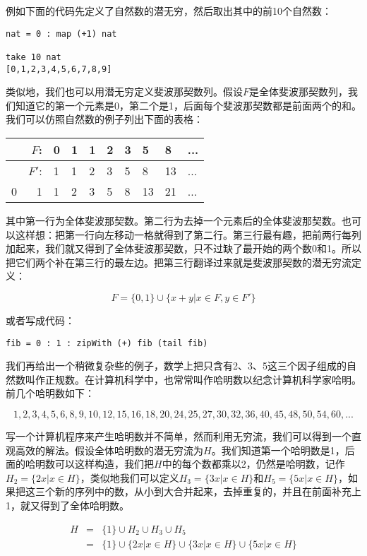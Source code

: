 \documentclass{article}
\begin{document}
例如下面的代码先定义了自然数的潜无穷，然后取出其中的前10个自然数：

\lstset{frame=single}
\begin{lstlisting}
nat = 0 : map (+1) nat

take 10 nat
[0,1,2,3,4,5,6,7,8,9]
\end{lstlisting}

类似地，我们也可以用潜无穷定义斐波那契数列。假设$F$是全体斐波那契数列，我们知道它的第一个元素是0，第二个是1，后面每个斐波那契数都是前面两个的和。我们可以仿照自然数的例子列出下面的表格：

\begin{tabular}{|r|r|l|l|l|l|l|l|l|l|}
\hline
  & $F$:  & 0 & 1 & 1 & 2 & 3 & 5 & 8 & ... \\
\hline
  & $F'$: & 1 & 1 & 2 & 3 & 5 & 8 & 13 & ... \\
\hline
0 & 1     & 1 & 2 & 3 & 5 & 8 & 13 & 21 & ... \\
\hline
\end{tabular}

其中第一行为全体斐波那契数。第二行为去掉一个元素后的全体斐波那契数。也可以这样想：把第一行向左移动一格就得到了第二行。第三行最有趣，把前两行每列加起来，我们就又得到了全体斐波那契数，只不过缺了最开始的两个数0和1。所以把它们两个补在第三行的最左边。把第三行翻译过来就是斐波那契数的潜无穷流定义：

\[
F = \{0, 1\} \cup \{ x + y | x \in F, y \in F'\}
\]

或者写成代码：
\begin{lstlisting}
fib = 0 : 1 : zipWith (+) fib (tail fib)
\end{lstlisting}

我们再给出一个稍微复杂些的例子，数学上把只含有2、3、5这三个因子组成的自然数叫作正规数。在计算机科学中，也常常叫作哈明数以纪念计算机科学家哈明。前几个哈明数如下：

\[
1, 2, 3, 4, 5, 6, 8, 9, 10, 12, 15, 16, 18, 20, 24, 25, 27, 30, 32, 36, 40, 45, 48, 50, 54, 60, ...
\]

写一个计算机程序来产生哈明数并不简单，然而利用无穷流，我们可以得到一个直观高效的解法。假设全体哈明数的潜无穷流为$H$。我们知道第一个哈明数是1，后面的哈明数可以这样构造，我们把$H$中的每个数都乘以2，仍然是哈明数，记作$H_2 = \{ 2x | x \in H \}$，类似地我们可以定义$H_3 = \{ 3x | x \in H \}$和$H_5 = \{ 5x | x \in H \}$，如果把这三个新的序列中的数，从小到大合并起来，去掉重复的，并且在前面补充上1，就又得到了全体哈明数。

\[
\begin{array}{rcl}
H & = & \{ 1 \} \cup H_2 \cup H_3 \cup H_5 \\
  & = & \{ 1 \} \cup \{ 2x | x \in H \} \cup \{ 3x | x \in H \} \cup \{ 5x | x \in H \} \\
\end{array}
\]
\end{document}
